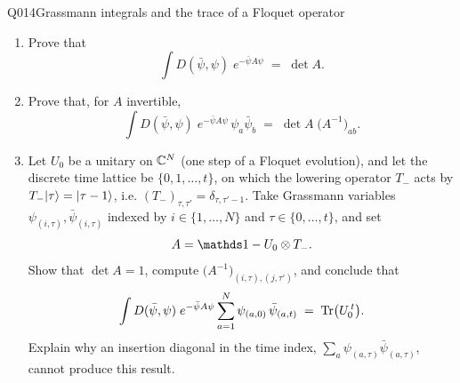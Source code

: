 \begin{entry}{Q014}{Grassmann integrals and the trace of a Floquet operator}
\begin{problem}
\begin{enumerate}[label=\textbf{(\alph*)},leftmargin=*]
  \item Prove that
        \[
          \int D(\bar\psi,\psi)\; e^{-\bar\psi A\psi} \;=\;\det A .
        \]
  \item Prove that, for $A$ invertible,
        \[
          \int D(\bar\psi,\psi)\; e^{-\bar\psi A\psi}\,\psi_a\bar\psi_b
          \;=\;\det A\;\bigl(A^{-1}\bigr)_{ab} .
        \]
  \item Let $U_0$ be a unitary on $\mathbb{C}^{N}$ (one step of a Floquet evolution), and let
        the discrete time lattice be $\{0,1,\dots,t\}$, on which the lowering operator
        $T_-$ acts by $T_-\lvert \tau \rangle=\lvert \tau-1 \rangle$, i.e.
        $(T_-)_{\tau,\tau'}=\delta_{\tau,\tau'-1}$. Take Grassmann variables
        $\psi_{(i,\tau)},\bar\psi_{(i,\tau)}$ indexed by $i\in\{1,\dots,N\}$ and
        $\tau\in\{0,\dots,t\}$, and set
        \[
          A=\id-U_0\otimes T_- .
        \]
        Show that $\det A=1$, compute $\bigl(A^{-1}\bigr)_{(i,\tau),(j,\tau')}$, and
        conclude that
        \[
          \int D(\bar\psi,\psi)\; e^{-\bar\psi A\psi}
          \sum_{a=1}^{N}\psi_{(a,0)}\,\bar\psi_{(a,t)}
          \;=\;\operatorname{Tr}\bigl(U_0^{\,t}\bigr).
        \]
        Explain why an insertion diagonal in the time index, $\sum_a
        \psi_{(a,\tau)}\bar\psi_{(a,\tau)}$, cannot produce this result.
\end{enumerate}
\end{problem}



\end{entry}
